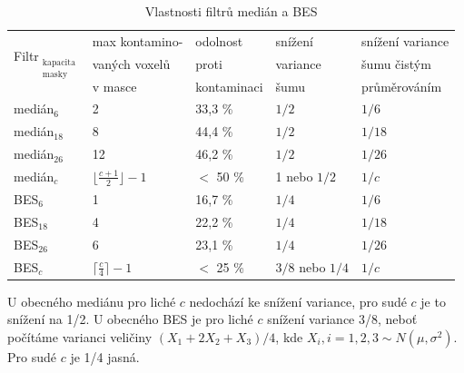 \begin{table}[h]\label{tab med BES}
    \begin{center}
    \begin{tabular}{lllll}
      \toprule
      \multirow{3}{*}{Filtr$_{\mathrm{\substack{kapacita\\ masky}}}$} & max kontamino- & odolnost    & snížení    & snížení variance \\
                                                    & vaných voxelů   & proti       & variance   & šumu čistým      \\
                                                    & v masce         & kontaminaci & šumu       & průměrováním     \\
      \midrule
      medián$_{\mathrm{6}}$             & 2                 & 33,3 \%       & $1/2$    & $1/6$ \\
      medián$_{\mathrm{18}}$            & 8                 & 44,4 \%       & $1/2$    & $1/18$ \\
      medián$_{\mathrm{26}}$            & 12                & 46,2 \%       & $1/2$    & $1/26$  \\
      medián$_{c}$                      & $\lfloor\frac{c+1}{2}\rfloor-1$& $<$ 50 \%& 1 nebo $1/2$& $1/c$\\
      BES$_{\mathrm{6}}$                & 1                 & 16,7 \%       & $1/4$   & $1/6$ \\
      BES$_{\mathrm{18}}$               & 4                 & 22,2 \%       & $1/4$   & $1/18$ \\
      BES$_{\mathrm{26}}$               & 6                 & 23,1 \%       & $1/4$   & $1/26$ \\
      BES$_{c}$                         & $\lceil\frac{c}{4}\rceil-1$& $<$ 25 \%& $3/8$ nebo $1/4$& $1/c$\\
      \bottomrule
    \end{tabular}
    \caption{Vlastnosti filtrů medián a BES}
    \end{center}
\end{table}

    U obecného mediánu pro liché $c$ nedochází ke snížení variance, pro sudé $c$ je to snížení na 1/2. U obecného BES je pro liché $c$ snížení variance 3/8, neboť počítáme varianci veličiny $(X_1 + 2X_2 + X_3)/4$, kde $X_i, i = 1,2,3 \sim N(\mu,\sigma^2)$. Pro sudé $c$ je 1/4 jasná.

